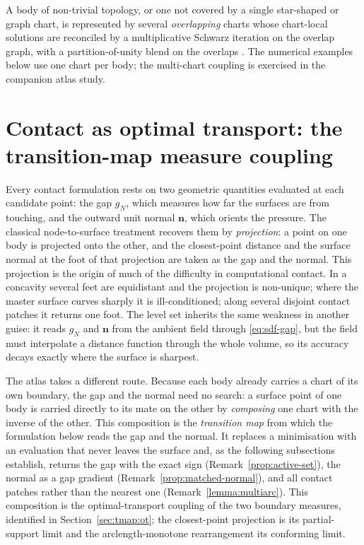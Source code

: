 \documentclass{svjour3}                 %
\newcommand{\nbf}{\bm{n}}
\newcommand{\gn}{g_{\scriptscriptstyle N}}
\begin{document}
\begin{remark}\label{rem:schwarz}
A body of non-trivial topology, or one not covered by a single star-shaped or graph chart, is represented by
several \emph{overlapping} charts whose chart-local solutions are reconciled by a multiplicative Schwarz
iteration on the overlap graph, with a partition-of-unity blend on the overlaps \citep{sun2026neuralatlas}. The
numerical examples below use one chart per body; the multi-chart coupling is exercised in the companion atlas
study.
\end{remark}

\section{Contact as optimal transport: the transition-map measure coupling}\label{sec:tmap}\label{sec:ot}

Every contact formulation rests on two geometric quantities evaluated at each candidate point: the gap $\gn$,
which measures how far the surfaces are from touching, and the outward unit normal $\nbf$, which orients the
pressure. The classical
node-to-surface treatment recovers them by \emph{projection}: a point on one body is projected onto the other,
and the closest-point distance and the surface normal at the foot of that projection are taken as the gap and
the normal. This projection is the origin of much of the difficulty in computational contact. In a concavity several feet
are equidistant and the projection is non-unique; where the master surface curves sharply it is
ill-conditioned; along several disjoint contact patches it returns one foot.
The level set inherits the same weakness in another guise: it reads $\gn$ and $\nbf$ from the ambient field
through \eqref{eq:sdf-gap}, but the field must interpolate a distance function through the whole volume, so its
accuracy decays exactly where the surface is sharpest.

The atlas takes a different route. Because each body already carries a chart of its own boundary, the gap and
the normal need no search: a surface point of one body is carried directly to its
mate on the other by \emph{composing} one chart with the inverse of the other. This composition is the
\emph{transition map} from which the formulation below reads the gap and the normal. It replaces a minimisation
with an evaluation that never leaves the surface and, as the following subsections establish, returns the gap
with the exact sign (Remark~\ref{prop:active-set}), the normal as a gap gradient (Remark~\ref{prop:matched-normal}),
and all contact patches rather than the nearest one (Remark~\ref{lemma:multiarc}). This composition is the
optimal-transport coupling of the two boundary measures, identified in Section~\ref{sec:tmap:ot}; the
closest-point projection is its partial-support limit and the arclength-monotone rearrangement its conforming
limit.
\end{document}
